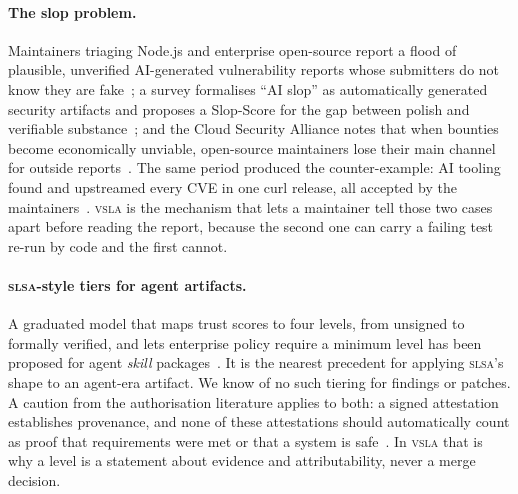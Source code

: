 \documentclass[11pt]{article}
\newcommand{\vsla}{\textsc{vsla}}
\newcommand{\slsa}{\textsc{slsa}}
\begin{document}
\paragraph{The slop problem.}
Maintainers triaging Node.js and enterprise open-source report a flood of plausible, unverified AI-generated
vulnerability reports whose submitters do not know they are fake~\cite{herodevs}; a survey formalises ``AI
slop'' as automatically generated security artifacts and proposes a Slop-Score for the gap between polish and
verifiable substance~\cite{slopsurvey}; and the Cloud Security Alliance notes that when bounties become
economically unviable, open-source maintainers lose their main channel for outside reports~\cite{csadisclosure}.
The same period produced the counter-example: AI tooling found and upstreamed every CVE in one curl release,
all accepted by the maintainers~\cite{herodevsguide}. \vsla{} is the mechanism that lets a maintainer tell those
two cases apart before reading the report, because the second one can carry a failing test re-run by code and
the first cannot.

\paragraph{\slsa{}-style tiers for agent artifacts.}
A graduated model that maps trust scores to four levels, from unsigned to formally verified, and lets enterprise
policy require a minimum level has been proposed for agent \emph{skill} packages~\cite{skillslsa}. It is the
nearest precedent for applying \slsa{}'s shape to an agent-era artifact. We know of no such tiering for findings
or patches. A caution from the authorisation literature applies to both: a signed attestation establishes
provenance, and none of these attestations should automatically count as proof that requirements were met or
that a system is safe~\cite{agentoutput}. In \vsla{} that is why a level is a statement about evidence and
attributability, never a merge decision.
\end{document}
